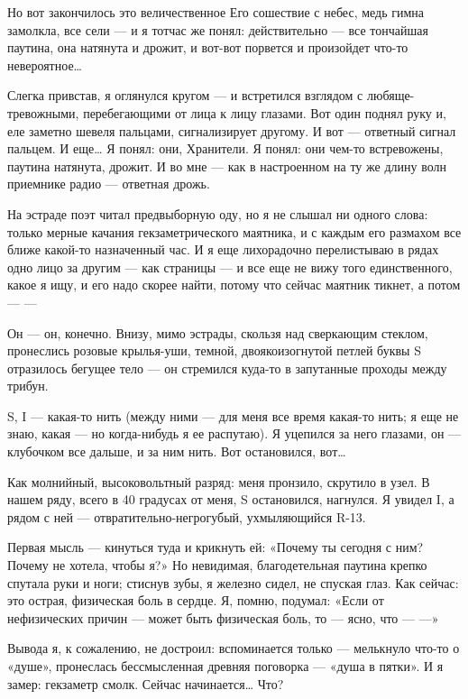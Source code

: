 \documentclass[11pt,openany]{book}
\begin{document}
Но вот закончилось это величественное Его сошествие с небес, медь гимна замолкла, все сели --- и я тотчас же понял: действительно --- все тончайшая паутина, она натянута и дрожит, и вот-вот порвется и произойдет что-то невероятное\ldots{}

Слегка привстав, я оглянулся кругом --- и встретился взглядом с любяще-тревожными, перебегающими от лица к лицу глазами. Вот один поднял руку и, еле заметно шевеля пальцами, сигнализирует другому. И вот --- ответный сигнал пальцем. И еще\ldots{} Я понял: они, Хранители. Я понял: они чем-то встревожены, паутина натянута, дрожит. И во мне --- как в настроенном на ту же длину волн приемнике радио --- ответная дрожь.

На эстраде поэт читал предвыборную оду, но я не слышал ни одного слова: только мерные качания гекзаметрического маятника, и с каждым его размахом все ближе какой-то назначенный час. И я еще лихорадочно перелистываю в рядах одно лицо за другим --- как страницы --- и все еще не вижу того единственного, какое я ищу, и его надо скорее найти, потому что сейчас маятник тикнет, а потом --- ---

Он --- он, конечно. Внизу, мимо эстрады, скользя над сверкающим стеклом, пронеслись розовые крылья-уши, темной, двоякоизогнутой петлей буквы S отразилось бегущее тело --- он стремился куда-то в запутанные проходы между трибун.

S, I --- какая-то нить (между ними --- для меня все время какая-то нить; я еще не знаю, какая --- но когда-нибудь я ее распутаю). Я уцепился за него глазами, он --- клубочком все дальше, и за ним нить. Вот остановился, вот\ldots{}

Как молнийный, высоковольтный разряд: меня пронзило, скрутило в узел. В нашем ряду, всего в 40 градусах от меня, S остановился, нагнулся. Я увидел I, а рядом с ней --- отвратительно-негрогубый, ухмыляющийся R-13.

Первая мысль --- кинуться туда и крикнуть ей: «Почему ты сегодня с ним? Почему не хотела, чтобы я?» Но невидимая, благодетельная паутина крепко спутала руки и ноги; стиснув зубы, я железно сидел, не спуская глаз. Как сейчас: это острая, физическая боль в сердце. Я, помню, подумал: «Если от нефизических причин --- может быть физическая боль, то --- ясно, что --- ---»

Вывода я, к сожалению, не достроил: вспоминается только --- мелькнуло что-то о «душе», пронеслась бессмысленная древняя поговорка --- «душа в пятки». И я замер: гекзаметр смолк. Сейчас начинается\ldots{} Что?
\end{document}
